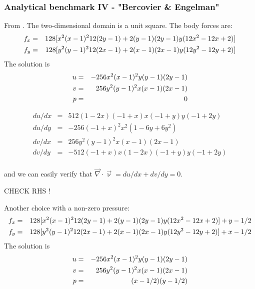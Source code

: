\subsubsection{Analytical benchmark IV \label{mms4} - "Bercovier \& Engelman"}

From \cite{been79}. The two-dimensional domain is a unit square. The body forces are:
\begin{eqnarray}
f_x &=& 128[ x^2(x-1)^2 12 (2y-1) + 2 (y-1)(2y-1)y(12x^2-12x+2)  ] \nonumber\\
f_y &=& 128[ y^2(y-1)^2 12 (2x-1) + 2 (x-1)(2x-1)y(12y^2-12y+2)  ] \nonumber\\
\end{eqnarray}
The solution is
\begin{eqnarray}
u &=& -256x^2(x-1)^2y(y-1)(2y-1) \nonumber\\
v &=&  256y^2(y-1)^2x(x-1)(2x-1) \nonumber\\
p &=& 0 
\end{eqnarray}

\begin{eqnarray}
du/dx &=& 512 (1 - 2x) (-1+x) x(-1+y) y(-1+2y) \\ 
du/dy &=& -256 (-1 + x)^2 x^2 (1 - 6 y + 6 y^2) \\ 
dv/dx &=&  256y^2(y-1)^2x(x-1)(2x-1) \\ 
dv/dy &=& -512 (-1 + x) x (1 - 2 x) (-1 + y) y (-1 + 2 y) \\
\end{eqnarray}

and we can easily verify that $\vec\nabla\cdot\vec\upnu=du/dx+dv/dy=0$.

CHECK RHS !

Another choice with a non-zero pressure:
\begin{eqnarray}
f_x &=& 128[ x^2(x-1)^2 12 (2y-1) + 2 (y-1)(2y-1)y(12x^2-12x+2)  ] + y - 1/2 \nonumber\\
f_y &=& 128[ y^2(y-1)^2 12 (2x-1) + 2 (x-1)(2x-1)y(12y^2-12y+2)  ] + x - 1/2 \nonumber\\
\end{eqnarray}
The solution is
\begin{eqnarray}
u &=& -256x^2(x-1)^2y(y-1)(2y-1) \nonumber\\
v &=&  256y^2(y-1)^2x(x-1)(2x-1) \nonumber\\
p &=& (x-1/2)(y-1/2) 
\end{eqnarray}


